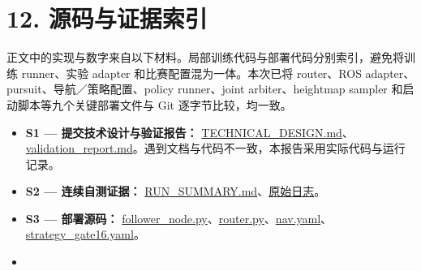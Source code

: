 \documentclass[
  10pt,
  a4paper,
]{article}
\providecommand{\tightlist}{%
  \setlength{\itemsep}{0pt}\setlength{\parskip}{0pt}}
\begin{document}
\clearpage

\section{12.
源码与证据索引}\label{ux6e90ux7801ux4e0eux8bc1ux636eux7d22ux5f15}

正文中的实现与数字来自以下材料。局部训练代码与部署代码分别索引，避免将训练
runner、实验 adapter 和比赛配置混为一体。本次已将 router、ROS
adapter、pursuit、导航／策略配置、policy runner、joint
arbiter、heightmap sampler 和启动脚本等九个关键部署文件与 Git
{\ttfamily\small{}} 逐字节比较，均一致。

\begin{itemize}
\tightlist
\item
  \textbf{S1 --- 提交技术设计与验证报告：}
  \href{/Users/xxxwbwxxx/Documents/Projects/goai26/resources/submission_update_20260820_392s/submission_20260820_392s_main3660b81/03_documents/TECHNICAL_DESIGN.md}{TECHNICAL\_DESIGN.md}、\href{/Users/xxxwbwxxx/Documents/Projects/goai26/resources/submission_update_20260820_392s/submission_20260820_392s_main3660b81/04_evidence/validation_report.md}{validation\_report.md}。遇到文档与代码不一致，本报告采用实际代码与运行记录。
\item
  \textbf{S2 --- 连续自测证据：}
  \href{/Users/xxxwbwxxx/Documents/Projects/goai26/resources/submission_update_20260820_392s/submission_20260820_392s_main3660b81/04_evidence/RUN_SUMMARY.md}{RUN\_SUMMARY.md}、\href{/Users/xxxwbwxxx/Documents/Projects/goai26/resources/submission_update_20260820_392s/submission_20260820_392s_main3660b81/04_evidence/raw/00_32_seed8.log}{原始日志}。
\item
  \textbf{S3 --- 部署源码：}
  \href{/Users/xxxwbwxxx/Documents/Projects/goai26/resources/submission_mac_retest_20260820/20260820_215224_main3660b81/source/goai26-s10-racing/src/s10_auto_nav/s10_auto_nav/follower_node.py}{follower\_node.py}、\href{/Users/xxxwbwxxx/Documents/Projects/goai26/resources/submission_mac_retest_20260820/20260820_215224_main3660b81/source/goai26-s10-racing/src/s10_auto_nav/s10_auto_nav/strategy/router.py}{router.py}、\href{/Users/xxxwbwxxx/Documents/Projects/goai26/resources/submission_mac_retest_20260820/20260820_215224_main3660b81/source/goai26-s10-racing/src/s10_bringup/config/nav.yaml}{nav.yaml}、\href{/Users/xxxwbwxxx/Documents/Projects/goai26/resources/submission_mac_retest_20260820/20260820_215224_main3660b81/source/goai26-s10-racing/src/s10_bringup/config/strategy_gate16.yaml}{strategy\_gate16.yaml}。
\item

\end{itemize}
\end{document}
